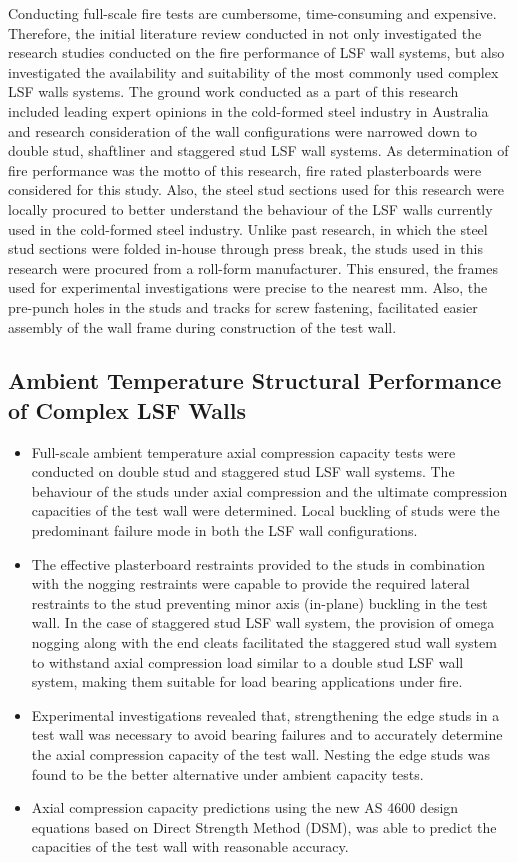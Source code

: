 Conducting full-scale fire tests are cumbersome, time-consuming and expensive. Therefore, the initial literature review conducted in  not only investigated the research studies conducted on the fire performance of LSF wall systems, but also investigated the availability and suitability of the most commonly used complex LSF walls systems. The ground work conducted as a part of this research included leading expert opinions in the cold-formed steel industry in Australia and research consideration of the wall configurations were narrowed down to double stud, shaftliner and staggered stud LSF wall systems. As determination of fire performance was the motto of this research, fire rated plasterboards were considered for this study. Also, the steel stud sections used for this research were locally procured to better understand the behaviour of the LSF walls currently used in the cold-formed steel industry. Unlike past research, in which the steel stud sections were folded in-house through press break, the studs used in this research were procured from a roll-form manufacturer. This ensured, the frames used for experimental investigations were precise to the nearest mm. Also, the pre-punch holes in the studs and tracks for screw fastening, facilitated easier assembly of the wall frame during construction of the test wall.  

\subsection{Ambient Temperature Structural Performance of Complex LSF Walls}
\begin{itemize}
	\item Full-scale ambient temperature axial compression capacity tests were conducted on double stud and staggered stud LSF wall systems. The behaviour of the studs under axial compression and the ultimate compression capacities of the test wall were determined. Local buckling of studs were the predominant failure mode in both the LSF wall configurations.
	\item The effective plasterboard restraints provided to the studs in combination with the nogging restraints were capable to provide the required lateral restraints to the stud preventing minor axis (in-plane) buckling in the test wall. In the case of staggered stud LSF wall system, the provision of omega nogging along with the end cleats facilitated the staggered stud wall system to withstand axial compression load similar to a double stud LSF wall system, making them suitable for load bearing applications under fire.
	\item Experimental investigations revealed that, strengthening the edge studs in a test wall was necessary to avoid bearing failures and to accurately determine the axial compression capacity of the test wall. Nesting the edge studs was found to be the better alternative under ambient capacity tests.  
	\item Axial compression capacity predictions using the new AS 4600 design equations based on Direct Strength Method (DSM), was able to predict the capacities of the test wall with reasonable accuracy.  
\end{itemize}

